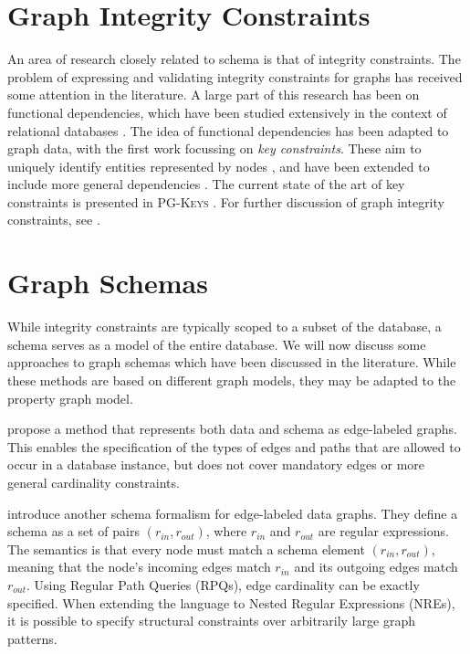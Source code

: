 \documentclass{report}
\theoremstyle{definition}
\begin{document}
\section{Graph Integrity Constraints}

An area of research closely related to schema is that of integrity constraints. The problem of expressing and validating integrity constraints for graphs has received some attention in the literature. A large part of this research has been on functional dependencies, which have been studied extensively in the context of relational databases \citep{fagin1984theory,abiteboul1999data}. The idea of functional dependencies has been adapted to graph data, with the first work focussing on \emph{key constraints}. These aim to uniquely identify entities represented by nodes \citep{fan2015keys}, and have been extended to include more general dependencies \citep{fan2016functional}. The current state of the art of key constraints is presented in \textsc{PG-Keys} \citep{angles2021keys}. For further discussion of graph integrity constraints, see \citet{bonifati2018querying}.

\section{Graph Schemas}

While integrity constraints are typically scoped to a subset of the database, a schema serves as a model of the entire database. We will now discuss some approaches to graph schemas which have been discussed in the literature. While these methods are based on different graph models, they may be adapted to the property graph model.

\citet{buneman1997adding} propose a method that represents both data and schema as edge-labeled graphs. This enables the specification of the types of edges and paths that are allowed to occur in a database instance, but does not cover mandatory edges or more general cardinality constraints.

\citet{colazzo2015typing} introduce another schema formalism for edge-labeled data graphs. They define a schema as a set of pairs $(r_{in}, r_{out})$, where $r_{in}$ and $r_{out}$ are regular expressions. The semantics is that every node must match a schema element $(r_{in}, r_{out})$, meaning that the node's incoming edges match $r_{in}$ and its outgoing edges match $r_{out}$. Using Regular Path Queries (RPQs), edge cardinality can be exactly specified. When extending the language to Nested Regular Expressions (NREs), it is possible to specify structural constraints over arbitrarily large graph patterns.
\end{document}
